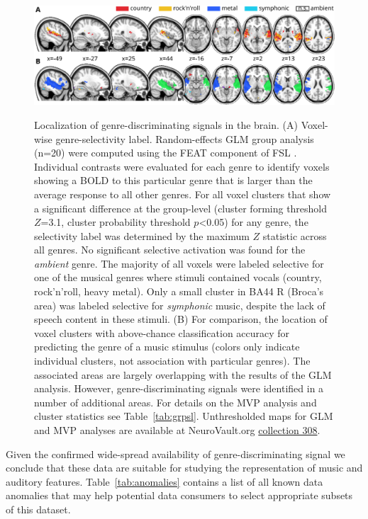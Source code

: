\documentclass[10pt,a4paper,twocolumn]{article}
\begin{document}
\begin{figure}[t] \centering \includegraphics[width=\linewidth]{blobs}\\
  \caption{Localization of genre-discriminating signals in the brain.  (A)
    Voxel-wise genre-selectivity label. Random-effects GLM group analysis
    (n=20) were computed using the FEAT component of FSL \cite{SJW+2004}.
    Individual contrasts were evaluated for each genre to identify voxels
    showing a BOLD to this particular genre that is larger than the average
    response to all other genres. For all voxel clusters that show a
    significant difference at the group-level (cluster forming threshold
    $Z$=3.1, cluster probability threshold $p$<0.05) for any genre, the
    selectivity label was determined by the maximum $Z$ statistic across all
    genres. No significant selective activation was found for the
    \textit{ambient} genre. The majority of all voxels were labeled selective
    for one of the musical genres where stimuli contained vocals (country,
    rock'n'roll, heavy metal). Only a small cluster in BA44 R (Broca's area)
    was labeled selective for \textit{symphonic} music, despite the lack of
    speech content in these stimuli.
  (B) For comparison, the location of voxel clusters with above-chance
  classification accuracy for predicting the genre of a music stimulus (colors
  only indicate individual clusters, not association with particular genres).
  The associated areas are largely
  overlapping with the results of the GLM analysis. However,
  genre-discriminating signals were identified in a number of additional areas.
  For details on the MVP analysis and cluster statistics see
  Table~\ref{tab:grpsl}. Unthresholded maps for GLM and MVP analyses are
  available at NeuroVault.org \cite{GVR+2015} \href{http://neurovault.org/collections/308/}{collection 308}.}
  \label{fig:blobs} \end{figure}

Given the confirmed wide-spread availability of genre-discriminating signal
we conclude that these data are suitable for studying the representation of
music and auditory features. Table~\ref{tab:anomalies} contains a list of all
known data anomalies that may help potential data consumers to select
appropriate subsets of this dataset.
\end{document}
